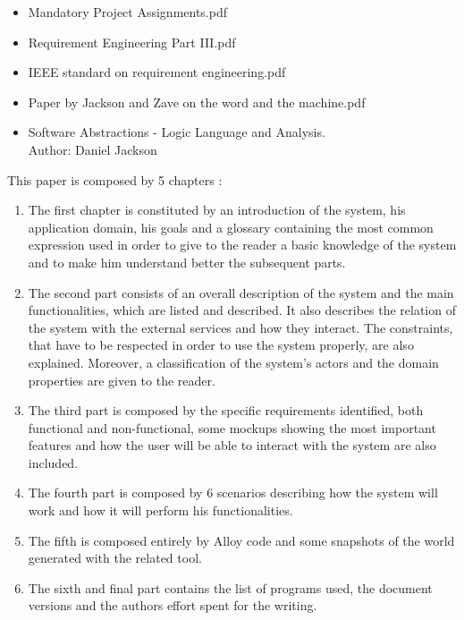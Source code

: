 \begin{itemize}
	\setlength{\leftskip}{0.5cm}
	\item Mandatory Project Assignments.pdf
	\item Requirement Engineering Part III.pdf
	\item IEEE standard on requirement engineering.pdf
	\item Paper by Jackson and Zave on the word and the machine.pdf
	\item Software Abstractions - Logic Language and Analysis.\\
	Author: Daniel Jackson
\end{itemize}

This paper is composed by 5 chapters :
\begin{enumerate}
	\setlength{\leftskip}{0.5cm}
	\item The first chapter is constituted by an introduction of the system, his application domain, his goals and a glossary containing the most common expression used in order to give to the reader a basic knowledge of the system and to make him understand better the subsequent parts.
	\item The second part consists of an overall description of the system and the main functionalities, which are listed and described. It also describes the relation of the system with the external services and how they interact. The constraints, that have to be respected in order to use the system properly, are also explained.
	Moreover, a classification of the system’s actors and the domain properties are given to the reader.
	\item The third part is composed by the specific requirements identified, both functional and non-functional, some mockups showing the most important features and how the user will be able to interact with the system are also included.
	\item The fourth part is composed by 6 scenarios describing how the system will work and how it will perform his functionalities.
	\item The fifth is composed entirely by Alloy code and some snapshots of the world generated with the related tool.
	\item The sixth and final part contains the list of programs used, the document versions and the authors effort spent for the writing.
\end{enumerate}
